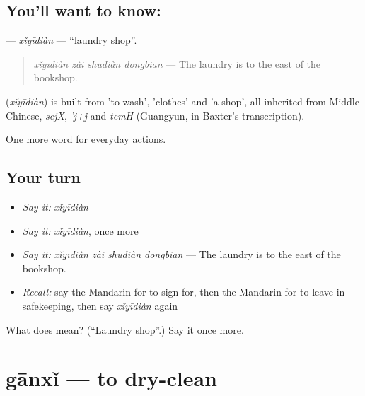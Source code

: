 \subsection*{You'll want to know: }
\textbf{} — \emph{xǐyīdiàn} — \textquotedblleft{}laundry shop\textquotedblright{}.

\begin{quote}
\textbf{} \emph{xǐyīdiàn zài shūdiàn dōngbian} — The laundry is to the east of the bookshop.
\end{quote}

\begin{cousinweb}
\textbf{} (\emph{xǐyīdiàn}) is built from  'to wash',  'clothes' and  'a shop', all inherited from Middle Chinese, \emph{sejX}, \emph{'j+j} and \emph{temH} (Guangyun, in Baxter's transcription).
\end{cousinweb}

\begin{grammarlens}[title={What you've built}]
One more word for everyday actions.
\end{grammarlens}

\subsection*{Your turn}
\begin{itemize}
\raggedright
  \item \emph{Say it:} \emph{xǐyīdiàn}
  \item \emph{Say it:} \emph{xǐyīdiàn}, once more
  \item \emph{Say it:} \emph{xǐyīdiàn zài shūdiàn dōngbian} — The laundry is to the east of the bookshop.
  \item \emph{Recall:} say the Mandarin for to sign for, then the Mandarin for to leave in safekeeping, then say \emph{xǐyīdiàn} again
\end{itemize}

\begin{tcolorbox}[breakable,colback=teal!4,colframe=teal!35!black,title={Before you move on}]
What does  mean? (\textquotedblleft{}Laundry shop\textquotedblright{}.) Say it once more.
\end{tcolorbox}
\section[gānxǐ]{gānxǐ — to dry-clean}

\label{lesson:ZH-C215-ganxi}



